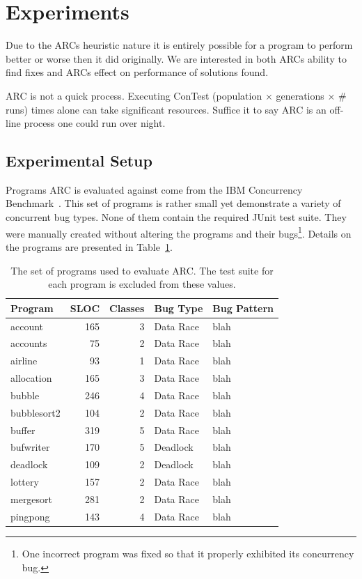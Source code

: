 \documentclass{llncs}
\begin{document}
\section{Experiments}
\label{sec:experiments}

Due to the ARCs heuristic nature it is entirely possible for a program to
perform better or worse then it did originally. We are interested in both ARCs
ability to find fixes and ARCs effect on performance of solutions found.

ARC is not a quick process. Executing ConTest (population $\times$ generations
$\times$ \# runs) times alone can take significant resources. Suffice it to say
ARC is an off-line process one could run over night.

\subsection{Experimental Setup}
\label{sec:experimental_setup}

Programs ARC is evaluated against come from the IBM Concurrency
Benchmark~\cite{EHSU06}. This set of programs is rather small yet demonstrate a
variety of concurrent bug types. None of them contain the required JUnit test
suite. They were manually created without altering the programs and their
bugs\footnote{One incorrect program was fixed so that it properly exhibited its
concurrency bug.}. Details on the programs are presented in
Table~\ref{tbl:used_programs}.


\begin{table}[h]
\caption{The set of programs used to evaluate ARC. The test suite for each
program is excluded from these values.}
\begin{center}
\begin{tabular}{|l|r|r|l|l|}
\hline
\textbf{Program} & \textbf{SLOC} & \textbf{Classes} & \textbf{Bug Type} & \textbf{Bug Pattern}\\
\hline
account & 165 & 3 & Data Race & blah\\
\hline
accounts & 75 & 2 & Data Race & blah\\
\hline
airline & 93 & 1 & Data Race & blah\\
\hline
allocation & 165 & 3 & Data Race & blah\\
\hline
bubble & 246 & 4 & Data Race & blah\\
\hline
bubblesort2 & 104 & 2 & Data Race & blah\\
\hline
buffer & 319 & 5 & Data Race & blah\\
\hline
bufwriter & 170 & 5 & Deadlock & blah\\
\hline
deadlock & 109 & 2 & Deadlock & blah\\
\hline
lottery & 157 & 2 & Data Race & blah\\
\hline
mergesort & 281 & 2 & Data Race & blah\\
\hline
pingpong & 143 & 4 & Data Race & blah\\
\hline
\end{tabular}
\label{tbl:used_programs}
\end{center}
\end{table}
\end{document}
